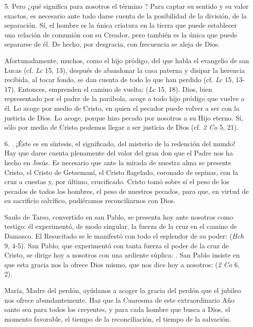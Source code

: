 \begin{body}
5. Pero ¿qué significa para nosotros el término ? Para captar su sentido y su valor exactos, es necesario ante todo darse cuenta de la posibilidad de la división, de la separación. Sí, el hombre es la única criatura en la tierra que puede establecer una relación de comunión con su Creador, pero también es la única que puede separarse de él. De hecho, por desgracia, con frecuencia se aleja de Dios.

Afortunadamente, muchos, como el hijo pródigo, del que habla el evangelio de san Lucas (cf. \textit{Lc} 15, 13), después de abandonar la casa paterna y disipar la herencia recibida, al tocar fondo, se dan cuenta de todo lo que han perdido (cf. \textit{Lc} 15, 13-17). Entonces, emprenden el camino de vuelta:  (\textit{Lc} 15, 18). Dios, bien representado por el padre de la parábola, acoge a todo hijo pródigo que vuelve a él. Lo acoge por medio de Cristo, en quien el pecador puede volver a ser  con la justicia de Dios. Lo acoge, porque hizo pecado por nosotros a su Hijo eterno. Sí, sólo por medio de Cristo podemos llegar a ser justicia de Dios (cf. \textit{2 Co} 5, 21).

6. . ¡Éste es en síntesis, el significado, del misterio de la redención del mundo! Hay que darse cuenta plenamente del valor del gran don que el Padre nos ha hecho en Jesús. Es necesario que ante la mirada de nuestra alma se presente Cristo, el Cristo de Getsemaní, el Cristo flagelado, coronado de espinas, con la cruz a cuestas y, por último, crucificado. Cristo tomó sobre sí el peso de los pecados de todos los hombres, el peso de nuestros pecados, para que, en virtud de su sacrificio salvífico, pudiéramos reconciliarnos con Dios.

Saulo de Tarso, convertido en san Pablo, se presenta hoy ante nosotros como testigo: él experimentó, de modo singular, la fuerza de la cruz en el camino de Damasco. El Resucitado se le manifestó con todo el esplendor de su poder:  (\textit{Hch} 9, 4-5). San Pablo, que experimentó con tanta fuerza el poder de la cruz de Cristo, se dirige hoy a nosotros con una ardiente súplica: . San Pablo insiste en que esta gracia nos la ofrece Dios mismo, que nos dice hoy a nosotros:  (\textit{2 Co} 6, 2).

María, Madre del perdón, ayúdanos a acoger la gracia del perdón que el jubileo nos ofrece abundantemente. Haz que la Cuaresma de este extraordinario Año santo sea para todos los creyentes, y para cada hombre que busca a Dios, el momento favorable, el tiempo de la reconciliación, el tiempo de la salvación.
\end{body}


